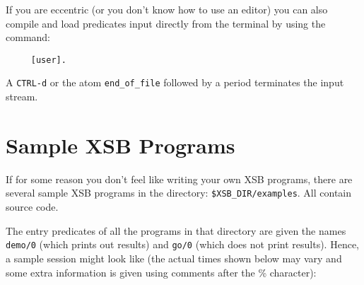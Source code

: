 If you are eccentric (or you don't know how to use an editor) you can also 
compile and load predicates input directly from the terminal by using the
command:
\begin{verbatim}
     [user].
\end{verbatim}
A {\tt CTRL-d} or the atom \verb'end_of_file' followed by a period 
terminates the input stream.


\section{Sample XSB Programs}

If for some reason you don't feel like writing your own XSB programs, 
there are several sample XSB programs in the directory: 
\verb'$XSB_DIR/examples'.  All contain source code.

The entry predicates of all the programs in that directory are given
the names {\tt demo/0} (which prints out results) and {\tt go/0}
(which does not print results). Hence, a sample session might look like
(the actual times shown below may vary and some extra information is given
using comments after the \% character):

